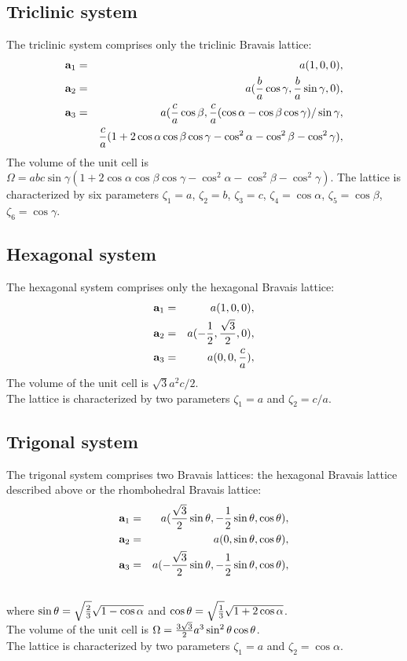 \documentclass[12pt,a4paper]{article}
\begin{document}
\subsection{\color{web-blue}Triclinic system}
The triclinic system comprises only the triclinic Bravais lattice:
\begin{eqnarray}
{\bf a}_1 &=& a (1, 0, 0), \nonumber \\
{\bf a}_2 &=& a ({b \over a}\cos\gamma, {b \over a}\sin\gamma, 0), \nonumber \\
{\bf a}_3 &=& a ({c \over a} \cos{\beta}, {c \over a}(\cos\alpha-\cos\beta\cos\gamma)/\sin\gamma,\nonumber \\
&\phantom{=}& {c \over a}(1+2\cos\alpha\cos\beta\cos\gamma-\cos^2\alpha-\cos^2\beta-\cos^2\gamma), \nonumber 
\end{eqnarray}
The volume of the unit cell is $\Omega=abc \sin\gamma \left( 
1+2\cos\alpha\cos\beta\cos\gamma-\cos^2\alpha-\cos^2\beta-\cos^2\gamma\right)
$.
The lattice is characterized by six parameters $\zeta_1=a$, 
$\zeta_2=b$, $\zeta_3=c$, $\zeta_4=\cos\alpha$,
$\zeta_5=\cos\beta$, $\zeta_6=\cos\gamma$.

\subsection{\color{web-blue}Hexagonal system}
The hexagonal system comprises only the hexagonal Bravais lattice:
\begin{eqnarray}
{\bf a}_1 &=& a (1, 0, 0), \nonumber \\
{\bf a}_2 &=& a (-{1 \over 2}, {\sqrt{3} \over 2}, 0), \nonumber \\
{\bf a}_3 &=& a (0, 0, {c\over a}), \nonumber
\nonumber
\end{eqnarray}
The volume of the unit cell is $\sqrt{3} a^2 c /2$. \\
The lattice is characterized by two parameters $\zeta_1=a$ 
and $\zeta_2=c/a$.

\subsection{\color{web-blue}Trigonal system}
The trigonal system comprises two Bravais lattices: the hexagonal Bravais 
lattice described above or the rhombohedral Bravais lattice:
\begin{eqnarray}
{\bf a}_1 &=& a ({\sqrt{3}\over 2}\sin{\theta}, -{1\over 2} \sin{\theta},
          \cos{\theta}), 
\nonumber \\
{\bf a}_2 &=& a (0, \sin{\theta}, \cos{\theta}), 
\nonumber \\
{\bf a}_3 &=& a (-{\sqrt{3}\over 2} \sin{\theta}, -{1\over 2} \sin{\theta},
         \cos{\theta}), 
\nonumber \\
\nonumber
\end{eqnarray}
where $\sin{\theta}=\sqrt{2\over 3}\sqrt{1-\cos{\alpha}}$
and $\cos{\theta}=\sqrt{1\over 3}\sqrt{1 + 2 \cos{\alpha}}$. \\
The volume of the unit cell is $\Omega={3 \sqrt{3} \over 2} a^3 \sin^2\theta
\cos\theta$. \\
The lattice is characterized by two parameters $\zeta_1=a$ and 
$\zeta_2=\cos\alpha$.
\end{document}
